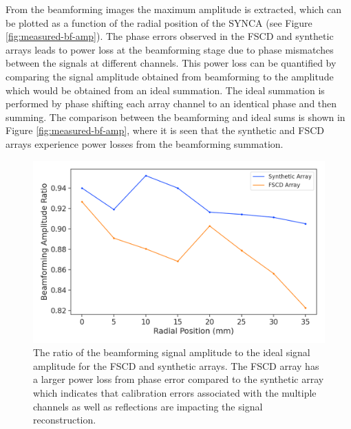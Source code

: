 From the beamforming images the maximum amplitude is extracted, which can be plotted as a function of the radial position of the SYNCA (see Figure \ref{fig:measured-bf-amp}). The phase errors observed in the FSCD and synthetic arrays leads to power loss at the beamforming stage due to phase mismatches between the signals at different channels. This power loss can be quantified by comparing the signal amplitude obtained from beamforming to the amplitude which would be obtained from an ideal summation. The ideal summation is performed by phase shifting each array channel to an identical phase and then summing. The comparison between the beamforming and ideal sums is shown in Figure \ref{fig:measured-bf-amp}, where it is seen that the synthetic and FSCD arrays experience power losses from the beamforming summation. 

\begin{figure}[htbp]
    \centering
    \includegraphics[width=.6\textwidth]{figs/Chapter-5/230509_beamformed_idealsum_ratio_compare.png}
    \caption{The ratio of the beamforming signal amplitude to the ideal signal amplitude for the FSCD and synthetic arrays. The FSCD array has a larger power loss from phase error compared to the synthetic array which indicates that calibration errors associated with the multiple channels as well as reflections are impacting the signal reconstruction. }
    \label{fig:jugaad-synth-bf-amp-ratio}
\end{figure}


